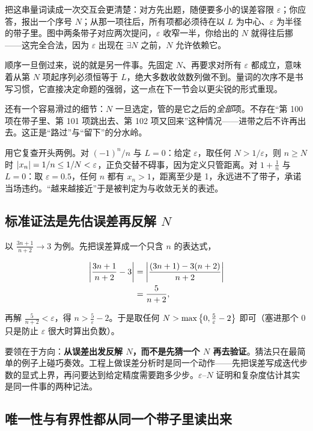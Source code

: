 把这串量词读成一次交互会更清楚：对方先出题，随便要多小的误差容限 \(\varepsilon\)；你应答，报出一个序号 \(N\)；从那一项往后，所有项都必须待在以 \(L\) 为中心、\(\varepsilon\) 为半径的带子里。图中两条带子对应两次提问，\(\varepsilon\) 收窄一半，你给出的 \(N\) 就得往后挪——这完全合法，因为 \(\varepsilon\) 出现在 \(\exists N\) 之前，\(N\) 允许依赖它。

顺序一旦倒过来，说的就是另一件事。先固定 \(N\)、再要求对所有 \(\varepsilon\) 都成立，意味着从第 \(N\) 项起序列必须恒等于 \(L\)，绝大多数收敛数列做不到。量词的次序不是书写习惯，它直接决定命题的强弱，这一点在下一节会以更尖锐的形式重现。

还有一个容易滑过的细节：\(N\) 一旦选定，管的是它之后的\emph{全部}项。不存在``第 100 项在带子里、第 101 项跳出去、第 102 项又回来''这种情况——进带之后不许再出去。这正是``路过''与``留下''的分水岭。

用它复查开头两例。对 \((-1)^n/n\) 与 \(L=0\)：给定 \(\varepsilon\)，取任何 \(N>1/\varepsilon\)，则 \(n\ge N\) 时 \(\left|x_n\right|=1/n\le 1/N<\varepsilon\)，正负交替不碍事，因为定义只管距离。对 \(1+\frac1n\) 与 \(L=0\)：取 \(\varepsilon=0.5\)，任何 \(n\) 都有 \(x_n>1\)，距离至少是 1，永远进不了带子，承诺当场违约。``越来越接近''于是被判定为与收敛无关的表述。

\subsection{标准证法是先估误差再反解 \(N\)}

以 \(\frac{3n+1}{n+2}\to3\) 为例。先把误差算成一个只含 \(n\) 的表达式，

\[
\begin{aligned}
\left|\frac{3n+1}{n+2}-3\right|
&= \left|\frac{(3n+1)-3(n+2)}{n+2}\right|\\
&= \frac{5}{n+2},
\end{aligned}
\]

再解 \(\frac{5}{n+2}<\varepsilon\)，得 \(n>\frac5\varepsilon-2\)。于是取任何 \(N>\max\left\{0,\frac5\varepsilon-2\right\}\) 即可（塞进那个 0 只是防止 \(\varepsilon\) 很大时算出负数）。

要领在于方向：\textbf{从误差出发反解 \(N\)，而不是先猜一个 \(N\) 再去验证}。猜法只在最简单的例子上碰巧奏效。工程上做误差分析时是同一个动作——先把误差写成迭代步数的显式上界，再问要达到给定精度需要跑多少步。\(\varepsilon\)--\(N\) 证明和复杂度估计其实是同一件事的两种记法。

\subsection{唯一性与有界性都从同一个带子里读出来}


